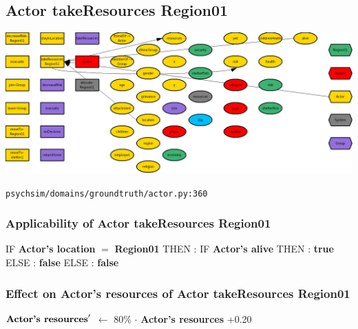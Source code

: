 \documentclass{article}%
\begin{document}
%
\subsection{Actor takeResources Region01}%
\label{subsec:Actor takeResources Region01}%
\includegraphics[width=\textwidth]{images/Actor-takeResources-Region01.png}%
\begin{flushleft}%
\verb|psychsim/domains/groundtruth/actor.py:360|%
\end{flushleft}%
\subsubsection{Applicability of Actor takeResources Region01}%
\label{ssubsec:Applicability of Actor takeResources Region01}%
\begin{flushleft}%
IF %
\textbf{Actor's location}%
$=$%
\textbf{Region01}%
\linebreak%
\hspace*{2em}%
THEN %
: %
IF %
\textbf{Actor's alive}%
\linebreak%
\hspace*{4em}%
THEN %
: %
\textbf{true}%
\linebreak%
\hspace*{4em}%
ELSE %
: %
\textbf{false}%
\linebreak%
\hspace*{2em}%
ELSE %
: %
\textbf{false}%
\end{flushleft}

%
\subsubsection{Effect on Actor's resources of Actor takeResources Region01}%
\label{ssubsec:Effect on Actor's resources of Actor takeResources Region01}%
\begin{flushleft}%
$\mbox{\textbf{Actor's resources}} '$%
$\leftarrow$%
80\%%
$\cdot$%
\textbf{Actor's resources}%
+0.20%
\end{flushleft}
\end{document}
